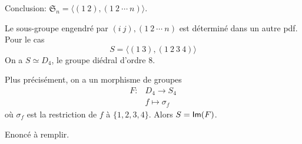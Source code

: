 {\begin{td-sol}[]
\begin{enumerate}
            Conclusion: \(\mathfrak{S}_n = \langle (1~2), (1~2~\cdots~n)\rangle\).

            \begin{remark}
                Le sous-groupe engendré par \((i~j), (1~2~\cdots~n)\) est déterminé
                dans un autre pdf. Pour le cas
                \begin{equation*}
                    S = \langle (1~3), (1~2~3~4)\rangle
                \end{equation*}
                On a \(S \simeq D_4\), le groupe diédral d'ordre 8.

                Plus précisément, on a un morphisme de groupes
                \begin{equation*}
                    \begin{aligned}
                        F\colon & D_4\to S_4\\
                        & f\mapsto\sigma_f
                    \end{aligned}
                \end{equation*}
                où \(\sigma_f\) est la restriction de \(f\) à \(\{1,2,3,4\}\).
                Alors \(S = \operatorname{\mathsf{Im}}(F)\).
            \end{remark}
        \end{enumerate}
    \end{td-sol}
}{}

\begin{td-exo}[Exo 13] %
    Enoncé à remplir.
\end{td-exo}

